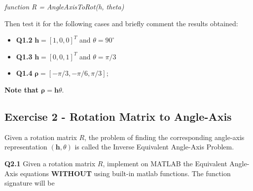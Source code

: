 \begin{center}\textit{function R = AngleAxisToRot(h, theta)}\end{center}


Then test it for the following cases and briefly comment the results obtained:
\begin{itemize}
    \item \textbf{Q1.2}\hspace{10mm} \begin{math} \textbf{h} = [1,0,0]^T\end{math} and  \begin{math} \theta = 90^\circ \end{math}
    \item \textbf{Q1.3}\hspace{10mm} \begin{math} \textbf{h} = [0,0,1]^T\end{math} and  \begin{math} \theta = \pi/3 \end{math}
    \item \textbf{Q1.4}\hspace{10mm} \begin{math} \mathbf{\rho} = [-\pi/3, -\pi/6 ,\pi/3];\end{math}
\end{itemize}
\textbf{Note that $\mathbf{\rho} = \textbf{h}\theta$}.
\subsection{Exercise 2 - Rotation Matrix to Angle-Axis}
Given a rotation matrix \begin{math}R\end{math}, the problem of finding the corresponding angle-axis representation \begin{math}(\textbf{h},\theta)\end{math} is called the Inverse Equivalent Angle-Axis Problem.
\newline


\textbf{Q2.1} Given a rotation matrix \begin{math}R\end{math}, implement on MATLAB the Equivalent Angle-Axis equations \textbf{WITHOUT} using built-in matlab functions. The function signature will be


